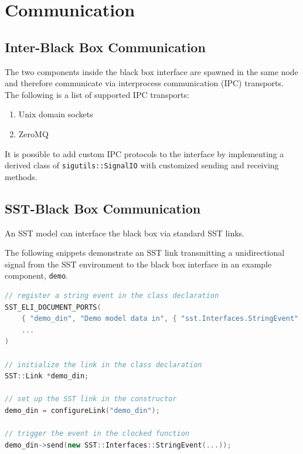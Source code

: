 \documentclass{article}
\begin{document}
  \section{Communication}

    \subsection{Inter-Black Box Communication}
    The two components inside the black box interface are spawned in the same node and therefore
    communicate via interprocess communication (IPC) transports. The following is a list of
    supported IPC transports:
    \begin{enumerate}
      \item Unix domain sockets
      \item ZeroMQ
    \end{enumerate}

    It is possible to add custom IPC protocols to the interface by implementing a derived class of
    \lstinline{sigutils::SignalIO} with customized sending and receiving methods.

    \subsection{SST-Black Box Communication}
    An SST model can interface the black box via standard SST links.

    The following snippets demonstrate an SST link transmitting a unidirectional signal from the SST
    environment to the black box interface in an example component, \lstinline{demo}.

\begin{lstlisting}[language=C++, caption={Snippet of \lstinline{demo.cpp}}, captionpos=b]
// register a string event in the class declaration
SST_ELI_DOCUMENT_PORTS(
    { "demo_din", "Demo model data in", { "sst.Interfaces.StringEvent" }},
    ...
)

// initialize the link in the class declaration
SST::Link *demo_din;

// set up the SST link in the constructor
demo_din = configureLink("demo_din");

// trigger the event in the clocked function
demo_din->send(new SST::Interfaces::StringEvent(...));
\end{lstlisting}
\end{document}
